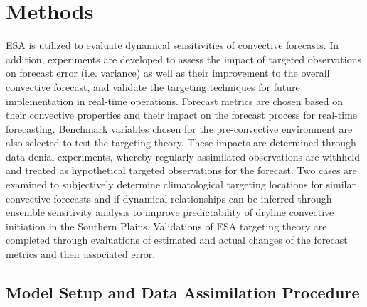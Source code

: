 \documentclass{ttuthes2007}
\newcommand{\tab}{\hspace*{2em}}  %
\begin{document}


\chapter{Methods}

\tab ESA is utilized to evaluate dynamical sensitivities of convective forecasts. In addition, experiments are developed to assess the impact of targeted observations on forecast error (i.e. variance) as well as their improvement to the overall convective forecast, and validate the targeting techniques for future implementation in real-time operations. Forecast metrics are chosen based on their convective properties and their impact on the forecast process for real-time forecasting. Benchmark variables chosen for the pre-convective environment are also selected to test the targeting theory. These impacts are determined through data denial experiments, whereby regularly assimilated observations are withheld and treated as hypothetical targeted observations for the forecast. Two cases are examined to subjectively determine climatological targeting locations for similar convective forecasts and if dynamical relationships can be inferred through ensemble sensitivity analysis to improve predictability of dryline convective initiation in the Southern Plains. Validations of ESA targeting theory are completed through evaluations of estimated and actual changes of the forecast metrics and their associated error. 

\section{Model Setup and Data Assimilation Procedure}
\end{document}
